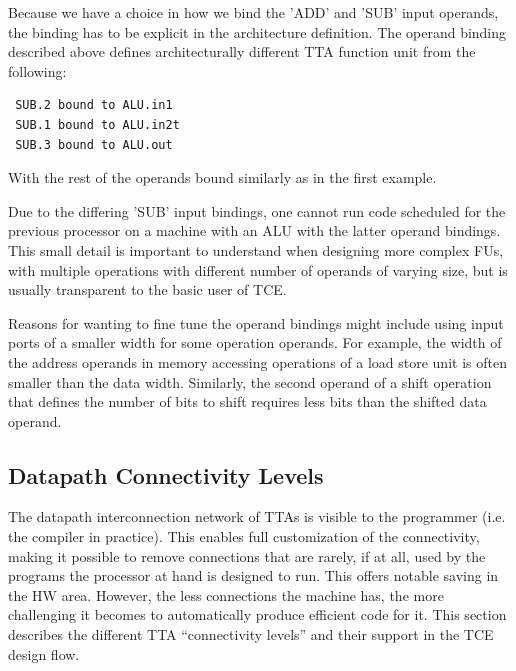 \documentclass[twoside]{tceusermanual}
\begin{document}
Because we have a choice in how we bind the 'ADD' and 'SUB' input operands,
the binding has to be explicit in the architecture definition. The operand
binding described above defines architecturally different TTA function unit
from the following:

\begin{verbatim}
 SUB.2 bound to ALU.in1
 SUB.1 bound to ALU.in2t
 SUB.3 bound to ALU.out
\end{verbatim}

With the rest of the operands bound similarly as in the first example.

Due to the differing 'SUB' input bindings, one cannot run code scheduled
for the previous processor on a machine with an ALU with the latter 
operand bindings. This small detail is important to understand when 
designing more complex FUs, with multiple operations with different number of 
operands of varying size, but is usually transparent to the basic user of 
TCE.

Reasons for wanting to fine tune the operand bindings might include using
input ports of a smaller width for some operation operands. For example, the 
width of the address operands in memory accessing operations of a load store 
unit is often smaller than the data width. Similarly, the second operand of
a shift operation that defines the number of bits to shift requires less
bits than the shifted data operand.


\subsection{Datapath Connectivity Levels}
\label{ConnectivityLevels}
The datapath interconnection network of TTAs is visible to the
programmer (i.e. the compiler in practice).  This enables full
customization of the connectivity, making it possible to remove
connections that are rarely, if at all, used by the programs the
processor at hand is designed to run. This offers notable saving in
the HW area. However, the less connections the machine has, the more
challenging it becomes to automatically produce efficient code for
it. This section describes the different TTA ``connectivity levels''
and their support in the TCE design flow.
\end{document}
